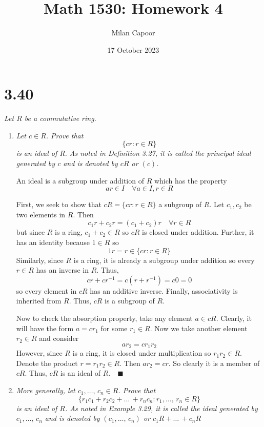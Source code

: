 \documentclass[12pt]{article}
\title{Math 1530: Homework 4}
\author{Milan Capoor}
\date{17 October 2023}
\newcommand{\qed}{\quad \blacksquare}
\begin{document}
\maketitle
\section*{3.40}
    \emph{Let $R$ be a commutative ring.}
    \begin{enumerate}[label=(\alph*)]
        \item \emph{Let $c \in R$. Prove that }
        \[\{cr : r \in R\}\] 
        \emph{is an ideal of R. As noted in Definition 3.27, it is called the principal ideal generated by $c$ and is denoted by $cR$ or $(c)$.}

            \color{blue}
                An ideal is a subgroup under addition of $R$ which has the property 
                \[ar \in I \quad \forall a \in I, r \in R\]

                First, we seek to show that $cR = \{cr : r \in R\}$ a subgroup of $R$. Let $c_1, c_2$ be two elements in $R$. Then 
                \[c_1r + c_2r = (c_1 + c_2)r \quad \forall r \in R\]
                but since $R$ is a ring, $c_1 + c_2 \in R$ so $cR$ is closed under addition. Further, it has an identity because $1 \in R$ so 
                \[1r = r \in \{cr : r\in R\}\] 
                Similarly, since $R$ is a ring, it is already a subgroup under addition so every $r \in R$ has an inverse in $R$. Thus, 
                \[cr + cr^{-1} = c(r + r^{-1}) = c0 = 0\]
                so every element in $cR$ has an additive inverse. Finally, associativity is inherited from $R$. Thus, $cR$ is a subgroup of $R$. 

                Now to check the absorption property, take any element $a \in cR$. Clearly, it will have the form $a = cr_1$ for some $r_1 \in R$. Now we take another element $r_2 \in R$ and consider
                \[ar_2 = cr_1 r_2\]
                However, since $R$ is a ring, it is closed under multiplication so $r_1r_2 \in R$. Denote the product $r = r_1 r_2 \in R$. Then $ar_2 = cr$. So clearly it is a member of $cR$. Thus, $cR$ is an ideal of $R. \qed$
            \color{black}

        \item \emph{More generally, let $c_1,\dots, \, c_n \in R$. Prove that}
        \[\{r_1c_1 + r_2c_2 + \dots\, + r_nc_n : r_1, \dots,\, r_n \in R\}\]
        \emph{is an ideal of $R$. As noted in Example 3.29, it is called the ideal generated by $c_1, \dots,\, c_n$ and is denoted by $(c_1, \dots,\, c_n)$ or $c_1R + \dots\, + c_nR$}


\end{enumerate}
\end{document}

